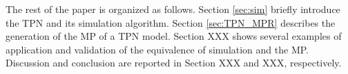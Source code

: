 \documentclass[suppldata]{interact}
\theoremstyle{plain}
\theoremstyle{definition}
\theoremstyle{remark}
\begin{document}
The rest of the paper is organized as follows. Section \ref{sec:sim} briefly introduce the TPN and its simulation algorithm. Section \ref{sec:TPN_MPR} describes the generation of the MP of a TPN model. Section XXX shows several examples of application and validation of the equivalence of simulation and the MP. Discussion and conclusion are reported in Section XXX and XXX, respectively.










\end{document}
